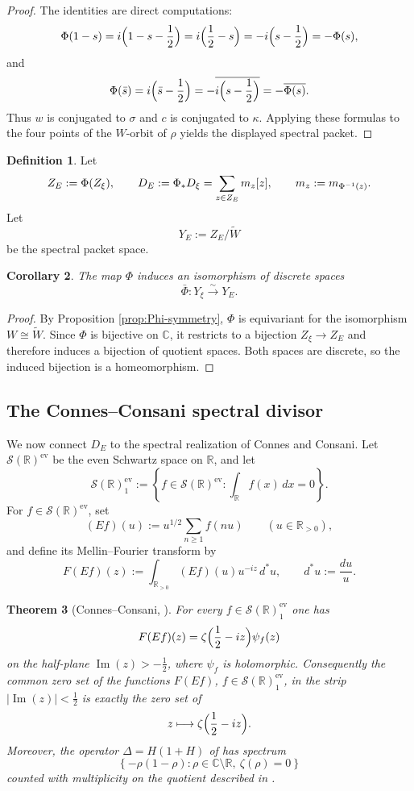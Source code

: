 \documentclass[11pt,a4paper]{article}
\numberwithin{equation}{section}
\newtheorem{theorem}{Theorem}[section]
\newtheorem{corollary}[theorem]{Corollary}
\theoremstyle{definition}
\newtheorem{definition}[theorem]{Definition}
\theoremstyle{remark}
\DeclareMathOperator{\Ima}{Im}
\newcommand{\RR}{\mathbb R}
\newcommand{\CC}{\mathbb C}
\newcommand{\cS}{\mathcal S}
\begin{document}
\begin{proof}
The identities are direct computations:
\[
\Phi(1-s)=i\Bigl(1-s-\frac12\Bigr)=i\Bigl(\frac12-s\Bigr)=-i\Bigl(s-\frac12\Bigr)=-\Phi(s),
\]
and
\[
\Phi(\bar s)=i\Bigl(\bar s-\frac12\Bigr)=-\overline{i\Bigl(s-\frac12\Bigr)}=-\overline{\Phi(s)}.
\]
Thus $w$ is conjugated to $\sigma$ and $c$ is conjugated to $\kappa$.  Applying these formulas to the four points of the $W$-orbit of $\rho$ yields the displayed spectral packet.
\end{proof}

\begin{definition}
Let
\[
Z_E:=\Phi(Z_\xi),
\qquad
D_E:=\Phi_*D_\xi=\sum_{z\in Z_E} m_z[z],
\\\qquad m_z:=m_{\Phi^{-1}(z)}.
\]
Let
\[
Y_E:=Z_E/\widetilde W
\]
be the spectral packet space.
\end{definition}

\begin{corollary}\label{cor:packet-space-iso}
The map $\Phi$ induces an isomorphism of discrete spaces
\[
\bar\Phi:Y_\xi\stackrel{\sim}{\longrightarrow} Y_E.
\]
\end{corollary}

\begin{proof}
By Proposition \ref{prop:Phi-symmetry}, $\Phi$ is equivariant for the isomorphism $W\cong\widetilde W$.  Since $\Phi$ is bijective on $\CC$, it restricts to a bijection $Z_\xi\to Z_E$ and therefore induces a bijection of quotient spaces.  Both spaces are discrete, so the induced bijection is a homeomorphism.
\end{proof}

\subsection{The Connes--Consani spectral divisor}

We now connect $D_E$ to the spectral realization of Connes and Consani.  Let $\cS(\RR)^{\mathrm{ev}}$ be the even Schwartz space on $\RR$, and let
\[
\cS(\RR)^{\mathrm{ev}}_1:=\left\{f\in\cS(\RR)^{\mathrm{ev}}: \int_{\RR} f(x)\,dx=0\right\}.
\]
For $f\in\cS(\RR)^{\mathrm{ev}}$, set
\[
(Ef)(u):=u^{1/2}\sum_{n\ge1} f(nu)
\qquad (u\in\RR_{>0}),
\]
and define its Mellin--Fourier transform by
\[
F(Ef)(z):=\int_{\RR_{>0}} (Ef)(u)u^{-iz}\,d^*u,
\qquad d^*u:=\frac{du}{u}.
\]

\begin{theorem}[Connes--Consani, \cite{ConnesConsaniCycles}]\label{thm:Connes-CC}
For every $f\in \cS(\RR)^{\mathrm{ev}}_1$ one has
\[
F(Ef)(z)=\zeta\Bigl(\frac12-iz\Bigr)\psi_f(z)
\]
on the half-plane $\Ima(z)>-\frac12$, where $\psi_f$ is holomorphic.  Consequently the common zero set of the functions $F(Ef)$, $f\in\cS(\RR)^{\mathrm{ev}}_1$, in the strip $|\Ima(z)|<\frac12$ is exactly the zero set of
\[
z\longmapsto \zeta\Bigl(\frac12-iz\Bigr).
\]
Moreover, the operator $\Delta=H(1+H)$ of \cite[Section~4]{ConnesConsaniCycles} has spectrum
\[
\left\{-\rho(1-\rho):\rho\in\CC\setminus\RR,\ \zeta(\rho)=0\right\}
\]
counted with multiplicity on the quotient described in \cite[Proposition~4.2]{ConnesConsaniCycles}.
\end{theorem}
\end{document}
